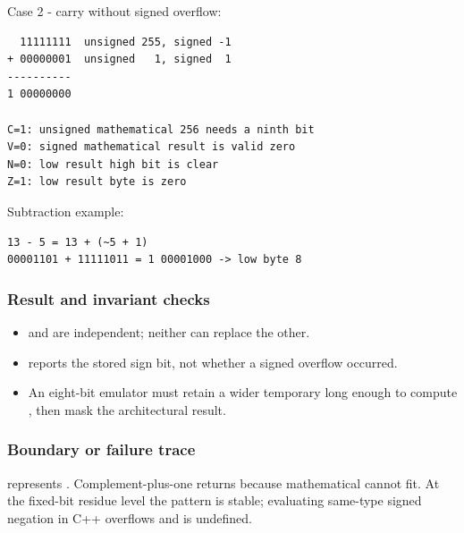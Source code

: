 Case 2 - carry without signed overflow:

\begin{verbatim}
  11111111  unsigned 255, signed -1
+ 00000001  unsigned   1, signed  1
----------
1 00000000

C=1: unsigned mathematical 256 needs a ninth bit
V=0: signed mathematical result is valid zero
N=0: low result high bit is clear
Z=1: low result byte is zero
\end{verbatim}

Subtraction example:

\begin{verbatim}
13 - 5 = 13 + (~5 + 1)
00001101 + 11111011 = 1 00001000 -> low byte 8
\end{verbatim}

\subsubsection{Result and invariant checks}\label{appendix-92ff77d4dfdc-result-and-invariant-checks-1}

\hypertarget{appendix-92ff77d4dfdc-result-and-invariant-checks-1}{}

\begin{itemize}
\tightlist
\item
   and  are independent; neither can replace the other.
\item
   reports the stored sign bit, not whether a signed overflow occurred.
\item
  An eight-bit emulator must retain a wider temporary long enough to compute , then mask the architectural result.
\end{itemize}

\subsubsection{Boundary or failure trace}\label{appendix-92ff77d4dfdc-boundary-or-failure-trace-1}

\hypertarget{appendix-92ff77d4dfdc-boundary-or-failure-trace-1}{}

 represents . Complement-plus-one returns  because mathematical  cannot fit. At the fixed-bit residue level the pattern is stable; evaluating same-type signed negation in C++ overflows and is undefined.

